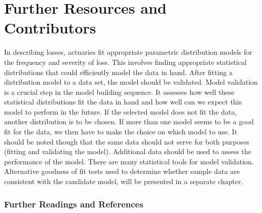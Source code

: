 \documentclass[]{book}
\theoremstyle{definition}
\theoremstyle{definition}
\theoremstyle{definition}
\theoremstyle{remark}
\begin{document}
\section{Further Resources and
Contributors}\label{Resources-loss-severity}

In describing losses, actuaries fit appropriate parametric distribution
models for the frequency and severity of loss. This involves finding
appropriate statistical distributions that could efficiently model the
data in hand. After fitting a distribution model to a data set, the
model should be validated. Model validation is a crucial step in the
model building sequence. It assesses how well these statistical
distributions fit the data in hand and how well can we expect this model
to perform in the future. If the selected model does not fit the data,
another distribution is to be chosen. If more than one model seems to be
a good fit for the data, we then have to make the choice on which model
to use. It should be noted though that the same data should not serve
for both purposes (fitting and validating the model). Additional data
should be used to assess the performance of the model. There are many
statistical tools for model validation. Alternative goodness of fit
tests used to determine whether sample data are consistent with the
candidate model, will be presented in a separate chapter.

\subsubsection*{Further Readings and
References}\label{further-readings-and-references}
\end{document}
